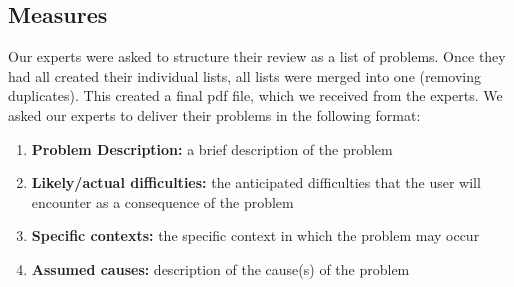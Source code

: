 \subsection{Measures}
Our experts were asked to structure their review as a list of problems. Once they had all created their individual lists, all lists were merged into one (removing duplicates). This created a final pdf file, which we received from the experts. We asked our experts to deliver their problems in the following format:\cite{problem}
\begin{enumerate}
\item\textbf{Problem Description:} a brief description of the problem
\item\textbf{Likely/actual difficulties:} the anticipated difficulties that the user will encounter as a consequence of the problem
\item\textbf{Specific contexts:} the specific context in which the problem may occur
\item\textbf{Assumed causes:} description of the cause(s) of the problem
\end{enumerate}